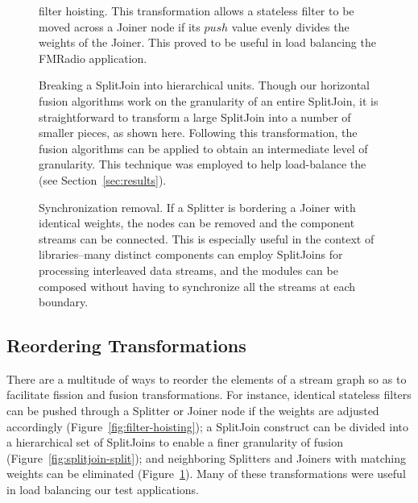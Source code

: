 \begin{figure}
\centering
{}
\caption{\protect\small filter hoisting.  This transformation allows a
stateless filter to be moved across a Joiner node if its $push$ value
evenly divides the weights of the Joiner.  This proved to be useful in
load balancing the FMRadio application.
\protect\label{fig:filter-hoisting}}
\vspace{12pt}
\caption{\protect\small Breaking a SplitJoin into hierarchical units.
Though our horizontal fusion algorithms work on the granularity of an
entire SplitJoin, it is straightforward to transform a large SplitJoin
into a number of smaller pieces, as shown here.  Following this
transformation, the fusion algorithms can be applied to obtain an
intermediate level of granularity.  This technique was employed to
help load-balance the \BeamFormer (see Section~\ref{sec:results}).
\protect\label{fig:splitjoin-split}}
\vspace{12pt}
\caption{\protect\small Synchronization removal.  If a Splitter is
bordering a Joiner with identical weights, the nodes can be removed
and the component streams can be connected.  This is especially useful
in the context of libraries--many distinct components can employ
SplitJoins for processing interleaved data streams, and the modules
can be composed without having to synchronize all the streams at each
boundary.  \protect\label{fig:sync-removal}}
\vspace{-6pt}
\end{figure}

\subsection{Reordering Transformations}
There are a multitude of ways to reorder the elements of a stream
graph so as to facilitate fission and fusion transformations.  For
instance, identical stateless filters can be pushed through a Splitter
or Joiner node if the weights are adjusted accordingly
(Figure~\ref{fig:filter-hoisting}); a SplitJoin construct can be
divided into a hierarchical set of SplitJoins to enable a finer
granularity of fusion (Figure~\ref{fig:splitjoin-split}); and
neighboring Splitters and Joiners with matching weights can be
eliminated (Figure~\ref{fig:sync-removal}).  Many of these
transformations were useful in load balancing our test applications.

